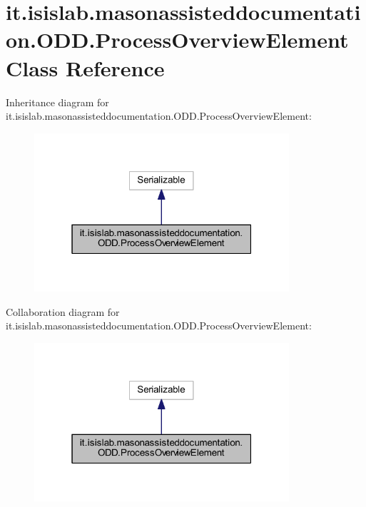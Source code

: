 \hypertarget{classit_1_1isislab_1_1masonassisteddocumentation_1_1_o_d_d_1_1_process_overview_element}{\section{it.\-isislab.\-masonassisteddocumentation.\-O\-D\-D.\-Process\-Overview\-Element Class Reference}
\label{classit_1_1isislab_1_1masonassisteddocumentation_1_1_o_d_d_1_1_process_overview_element}
}


Inheritance diagram for it.\-isislab.\-masonassisteddocumentation.\-O\-D\-D.\-Process\-Overview\-Element\-:
\nopagebreak
\begin{figure}[H]
\begin{center}
\leavevmode
\includegraphics[width=268pt]{classit_1_1isislab_1_1masonassisteddocumentation_1_1_o_d_d_1_1_process_overview_element__inherit__graph}
\end{center}
\end{figure}


Collaboration diagram for it.\-isislab.\-masonassisteddocumentation.\-O\-D\-D.\-Process\-Overview\-Element\-:
\nopagebreak
\begin{figure}[H]
\begin{center}
\leavevmode
\includegraphics[width=268pt]{classit_1_1isislab_1_1masonassisteddocumentation_1_1_o_d_d_1_1_process_overview_element__coll__graph}
\end{center}
\end{figure}
